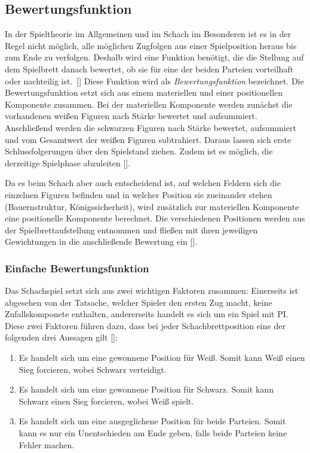 \subsection{Bewertungsfunktion}

In der Spieltheorie im Allgemeinen und im Schach im Besonderen ist es in der Regel nicht möglich, alle möglichen Zugfolgen aus einer Spielposition heraus bis zum Ende zu verfolgen.
Deshalb \glqq [...] wird eine Funktion benötigt, die die Stellung auf dem Spielbrett danach bewertet,
ob sie für eine der beiden Parteien vorteilhaft oder nachteilig ist.\grqq \ [\cite{Paulsen2009}]
Diese Funktion wird als \textit{Bewertungsfunktion} bezeichnet.
Die Bewertungsfunktion setzt sich aus einem materiellen und einer positionellen Komponente zusammen.
Bei der materiellen Komponente werden zunächst die vorhandenen weißen Figuren nach Stärke bewertet und aufsummiert.
Anschließend werden die schwarzen Figuren nach Stärke bewertet, aufsummiert und vom Gesamtwert der weißen Figuren subtrahiert.
Daraus lassen sich erste Schlussfolgerungen über den Spielstand ziehen.
Zudem ist es möglich, die derzeitige Spielphase abzuleiten [\cite{Paulsen2009}].

Da es beim Schach aber auch entscheidend ist, auf welchen Feldern sich die einzelnen Figuren befinden und in welcher Position sie zueinander stehen (Bauernstruktur, Königssicherheit), wird zusätzlich zur materiellen Komponente eine positionelle Komponente berechnet.
Die verschiedenen Positionen werden aus der Spielbrettaufstellung entnommen und fließen mit ihren jeweiligen Gewichtungen in die anschließende Bewertung ein [\cite{Paulsen2009}].


\subsubsection{Einfache Bewertungsfunktion}

Das Schachspiel setzt sich aus zwei wichtigen Faktoren zusammen: Einerseits ist abgesehen von der Tatsache, welcher Spieler den ersten Zug macht, keine Zufallskomponete enthalten, andererseits handelt es sich um ein Spiel mit \gls{PI}.
Diese zwei Faktoren führen dazu, dass bei jeder Schachbrettposition eine der folgenden drei Aussagen gilt [\cite{Shannon1950}]:

\begin{enumerate}
    \item Es handelt sich um eine gewonnene Position für Weiß. Somit kann Weiß einen Sieg forcieren, wobei Schwarz verteidigt.
    \item Es handelt sich um eine gewonnene Position für Schwarz. Somit kann Schwarz einen Sieg forcieren, wobei Weiß spielt.
    \item Es handelt sich um eine ausgeglichene Position für beide Parteien. Somit kann es nur ein Unentschieden am Ende geben, falls beide Parteien keine Fehler machen.
\end{enumerate}

